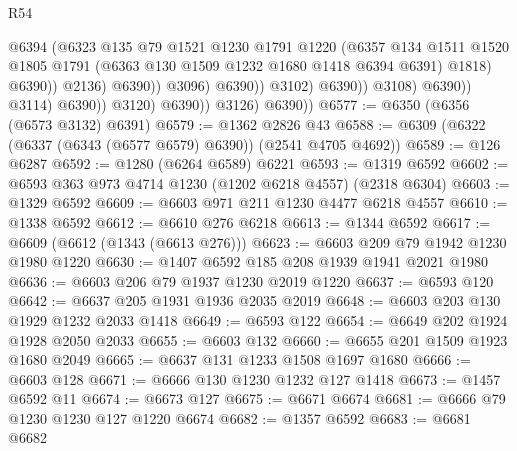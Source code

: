 \begin{lexlean}{R54}
\begin{coremodule}
                                                @6394
                                                (@6323
                                                  @135
                                                  @79
                                                  @1521
                                                  @1230
                                                  @1791
                                                  @1220
                                                  (@6357
                                                    @134
                                                    @1511
                                                    @1520
                                                    @1805
                                                    @1791
                                                    (@6363 @130 @1509 @1232 @1680 @1418 @6394 @6391)
                                                    @1818)
                                                  @6390))
                                              @2136)
                                            @6390))
                                        @3096)
                                      @6390))
                                  @3102)
                                @6390))
                            @3108)
                          @6390))
                      @3114)
                    @6390))
                @3120)
              @6390))
          @3126)
        @6390))
@6577 := @6350 (@6356 (@6573 @3132) @6391)
@6579 := @1362 @2826 @43
@6588 := @6309 (@6322 (@6337 (@6343 (@6577 @6579) @6390)) (@2541 @4705 @4692))
@6589 := @126 @6287
@6592 := @1280 (@6264 @6589) @6221
@6593 := @1319 @6592
@6602 := @6593 @363 @973 @4714 @1230 (@1202 @6218 @4557) (@2318 @6304)
@6603 := @1329 @6592
@6609 := @6603 @971 @211 @1230 @4477 @6218 @4557
@6610 := @1338 @6592
@6612 := @6610 @276 @6218
@6613 := @1344 @6592
@6617 := @6609 (@6612 (@1343 (@6613 @276)))
@6623 := @6603 @209 @79 @1942 @1230 @1980 @1220
@6630 := @1407 @6592 @185 @208 @1939 @1941 @2021 @1980
@6636 := @6603 @206 @79 @1937 @1230 @2019 @1220
@6637 := @6593 @120
@6642 := @6637 @205 @1931 @1936 @2035 @2019
@6648 := @6603 @203 @130 @1929 @1232 @2033 @1418
@6649 := @6593 @122
@6654 := @6649 @202 @1924 @1928 @2050 @2033
@6655 := @6603 @132
@6660 := @6655 @201 @1509 @1923 @1680 @2049
@6665 := @6637 @131 @1233 @1508 @1697 @1680
@6666 := @6603 @128
@6671 := @6666 @130 @1230 @1232 @127 @1418
@6673 := @1457 @6592 @11
@6674 := @6673 @127
@6675 := @6671 @6674
@6681 := @6666 @79 @1230 @1230 @127 @1220 @6674
@6682 := @1357 @6592
@6683 := @6681 @6682

\end{coremodule}
\end{lexlean}
